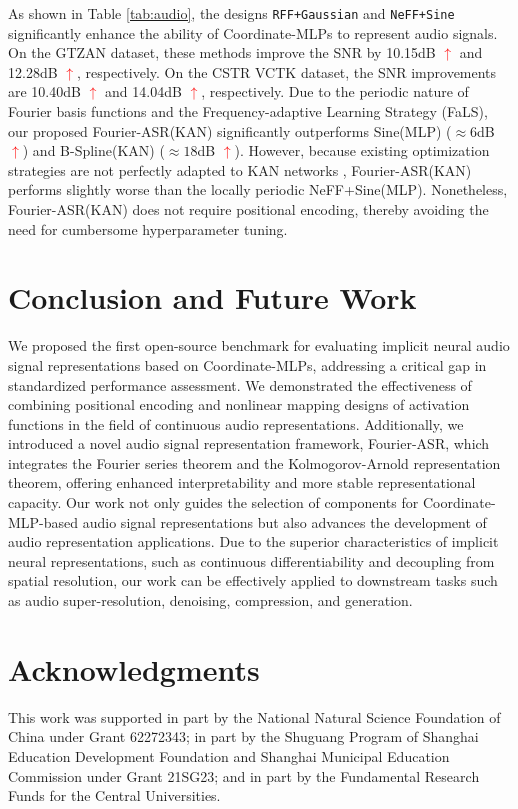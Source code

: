 \documentclass[letterpaper]{article} %
\begin{document}
As shown in Table \ref{tab:audio}, the designs \texttt{RFF+Gaussian} and \texttt{NeFF+Sine} significantly enhance the ability of Coordinate-MLPs to represent audio signals. On the GTZAN dataset, these methods improve the SNR by 10.15dB \textcolor{red}{$\uparrow$} and 12.28dB \textcolor{red}{$\uparrow$}, respectively. On the CSTR VCTK dataset, the SNR improvements are 10.40dB \textcolor{red}{$\uparrow$} and 14.04dB \textcolor{red}{$\uparrow$}, respectively. Due to the periodic nature of Fourier basis functions and the Frequency-adaptive Learning Strategy (FaLS), our proposed Fourier-ASR(KAN) significantly outperforms Sine(MLP) ($\approx6$dB \textcolor{red}{$\uparrow$}) and B-Spline(KAN) ($\approx18$dB \textcolor{red}{$\uparrow$}). However, because existing optimization strategies are not perfectly adapted to KAN networks \cite{liu2024kan}, Fourier-ASR(KAN) performs slightly worse than the locally periodic NeFF+Sine(MLP). Nonetheless, Fourier-ASR(KAN) does not require positional encoding, thereby avoiding the need for cumbersome hyperparameter tuning.

\section{Conclusion and Future Work}
We proposed the first open-source benchmark for evaluating implicit neural audio signal representations based on Coordinate-MLPs, addressing a critical gap in standardized performance assessment. We demonstrated the effectiveness of combining positional encoding and nonlinear mapping designs of activation functions in the field of continuous audio representations. Additionally, we introduced a novel audio signal representation framework, Fourier-ASR, which integrates the Fourier series theorem and the Kolmogorov-Arnold representation theorem, offering enhanced interpretability and more stable representational capacity. Our work not only guides the selection of components for Coordinate-MLP-based audio signal representations but also advances the development of audio representation applications. Due to the superior characteristics of implicit neural representations, such as continuous differentiability and decoupling from spatial resolution, our work can be effectively applied to downstream tasks such as audio super-resolution, denoising, compression, and generation.

\section*{Acknowledgments}
This work was supported in part by the National Natural Science Foundation of China under Grant 62272343; in part by the Shuguang Program of Shanghai Education Development Foundation and Shanghai Municipal Education Commission under Grant 21SG23; and in part by the Fundamental Research Funds for the Central Universities.
\end{document}
